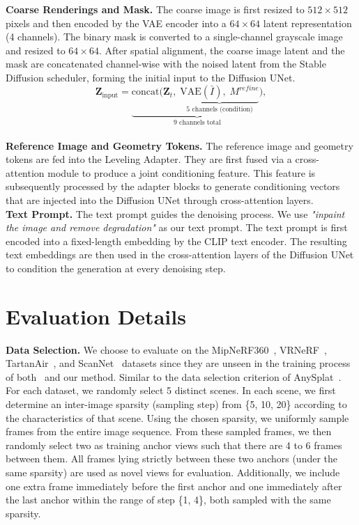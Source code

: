 \noindent\textbf{Coarse Renderings and Mask.}
The coarse image is first resized to $512 \times 512$ pixels and then encoded by the VAE encoder into a $64 \times 64$ latent representation (4 channels). 
The binary mask is converted to a single-channel grayscale image and resized to $64 \times 64$. 
After spatial alignment, the coarse image latent and the mask are concatenated channel-wise with the noised latent from the Stable Diffusion scheduler, forming the initial input to the Diffusion UNet.
\begin{equation}
\mathbf{Z}_{\text{input}} = \underbrace{\text{concat} \Big( \mathbf{Z}_t,\; \underbrace{\text{VAE}(\bar{I}),\; {M}^{refine}}_{\text{5 channels (condition)}} \Big)}_{\text{9 channels total}},
\end{equation}
\\

\noindent\textbf{Reference Image and Geometry Tokens.}
The reference image and geometry tokens are fed into the Leveling Adapter. 
They are first fused via a cross-attention module to produce a joint conditioning feature. 
This feature is subsequently processed by the adapter blocks to generate conditioning vectors that are injected into the Diffusion UNet through cross-attention layers.
\\

\noindent\textbf{Text Prompt.}
The text prompt guides the denoising process. We use \textit{"inpaint the image and remove degradation"} as our text prompt.
The text prompt is first encoded into a fixed-length embedding by the CLIP text encoder.
The resulting text embeddings are then used in the cross-attention layers of the Diffusion UNet to condition the generation at every denoising step.
\\

\section{Evaluation Details}
\noindent\textbf{Data Selection.} We choose to evaluate on the MipNeRF360~\cite{barron2022mip}, VRNeRF~\cite{xu2023vr}, TartanAir~\cite{wang2020tartanair}, and ScanNet~\cite{dai2017scannet} datasets since they are unseen in the training process of both~\cite{wang2025vggt, jiang2025anysplat} and our method. Similar to the data selection criterion of AnySplat~\cite{jiang2025anysplat}. 
For each dataset, we randomly select 5 distinct scenes. 
In each scene, we first determine an inter-image sparsity (sampling step) from \{5, 10, 20\} according to the characteristics of that scene. 
Using the chosen sparsity, we uniformly sample frames from the entire image sequence. 
From these sampled frames, we then randomly select two as training anchor views such that there are 4 to 6 frames between them. 
All frames lying strictly between these two anchors (under the same sparsity) are used as novel views for evaluation. 
Additionally, we include one extra frame immediately before the first anchor and one immediately after the last anchor within the range of step \{1, 4\}, both sampled with the same sparsity.
\\


